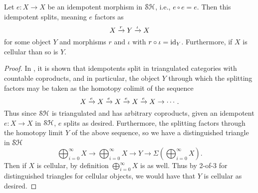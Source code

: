 \documentclass[../main.tex]{subfiles}
\begin{document}
\begin{lemma}\label{cellular_idempotent_splits_cellularly}
	Let $e:X\to X$ be an idempotent morphism in $\mathcal{SH}$, i.e., $e\circ e=e$. Then this idempotent splits, meaning $e$ factors as
	\[X\xrightarrow rY\xrightarrow\iota X\]
	for some object $Y$ and morphisms $r$ and $\iota$ with $r\circ\iota=\mathrm{id}_Y$. Furthermore, if $X$ is cellular than so is $Y$.
\end{lemma}
\begin{proof}
	In \cite[Proposition 1.6.8]{Neeman_2001}, it is shown that idempotents split in triangulated categories with countable coproducts, and in particular, the object $Y$ through which the splitting factors may be taken as the homotopy colimit of the sequence
	\[X\xrightarrow eX\xrightarrow eX\xrightarrow eX\xrightarrow e X\to\cdots.\]
	Thus since $\mathcal{SH}$ is triangulated and has arbitrary coproducts, given an idempotent $e:X\to X$ in $\mathcal{SH}$, $e$ splits as desired. Furthermore, the splitting factors through the homotopy limit $Y$ of the above sequence, so we have a distinguished triangle in $\mathcal{SH}$
	\[\bigoplus_{i=0}^\infty X\to\bigoplus_{i=0}^\infty X\to Y\to\Sigma(\bigoplus_{i=0}^\infty X).\]
	Then if $X$ is cellular, by definition $\bigoplus_{i=0}^\infty X$ is as well. Thus by 2-of-3 for distinguished triangles for cellular objects, we would have that $Y$ is cellular as desired.
\end{proof}
\end{document}

